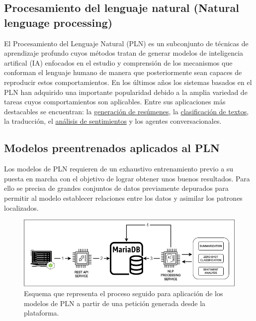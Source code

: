 \subsection{Procesamiento del lenguaje natural (Natural lenguage processing)} \label{sec:pln}

El Procesamiento del Lenguaje Natural (PLN) \cite{ct:pln_universidad_san_marcos} es un subconjunto de técnicas de aprendizaje profundo cuyos métodos tratan de generar modelos de inteligencia artifical (IA) enfocados en el estudio y comprensión de los mecanismos que conforman el lenguaje humano de manera que posteriormente sean capaces de reproducir estos comportamientos. En los últimos años los sistemas basados en el PLN han adquirido una importante popularidad debido a la amplia variedad de tareas cuyos comportamientos son aplicables. Entre sus aplicaciones más destacables se encuentran: la \hyperref[sec:summarization]{generación de resúmenes}, la \hyperref[sec:clasificadorzeroshot]{clasificación de textos}, la traducción, el \hyperref[sec:analisissentimientos]{análisis de sentimientos} y los agentes conversacionales.

\subsection{Modelos preentrenados aplicados al PLN} \label{sec:preentrenados}

Los modelos de PLN requieren de un exhaustivo entrenamiento previo a su puesta en marcha con el objetivo de lograr obtener unos buenos resultados. Para ello se precisa de grandes conjuntos de datos previamente depurados para permitir al modelo establecer relaciones entre los datos y asimilar los patrones localizados.

\begin{figure}[!ht]
	\centering
\includegraphics[width=\textwidth]{img/applying_nlp_process.png}
	\caption{Esquema que representa el proceso seguido para aplicación de los modelos de PLN a partir de una petición generada desde la plataforma.}
	\label{fig:apply_nlp_process}
\end{figure}

